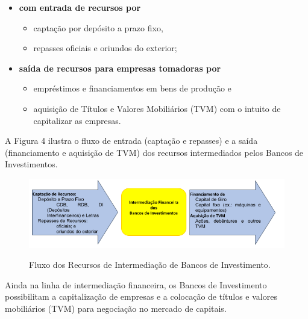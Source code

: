 \documentclass{article}\usepackage[]{graphicx}\usepackage[]{xcolor}
\begin{document}
\begin{itemize}

  \item \textbf{com entrada de recursos por}

    \begin{itemize}

      \item captação por depósito a prazo fixo,

      \item repasses oficiais e oriundos do exterior;

    \end{itemize}

  \item \textbf{saída de recursos para empresas tomadoras por}

    \begin{itemize}

      \item empréstimos e financiamentos em bens de produção e

      \item aquisição de Títulos e Valores Mobiliários (TVM) com o intuito de capitalizar as empresas.

    \end{itemize}

\end{itemize}

A Figura 4 ilustra o fluxo de entrada (captação e repasses) e a saída (financiamento e aquisição de TVM)
dos recursos intermediados pelos Bancos de Investimentos.

\begin{figure}[H]
\includegraphics[width=12cm]{banco-investimento}
\centering
\label{banco-invest}
\caption{Fluxo dos Recursos de Intermediação de Bancos de Investimento.}
\end{figure}

Ainda na linha de intermediação financeira, os Bancos de Investimento possibilitam a capitalização de
empresas e a colocação de títulos e valores mobiliários (TVM) para negociação no mercado de capitais.\par
\end{document}
